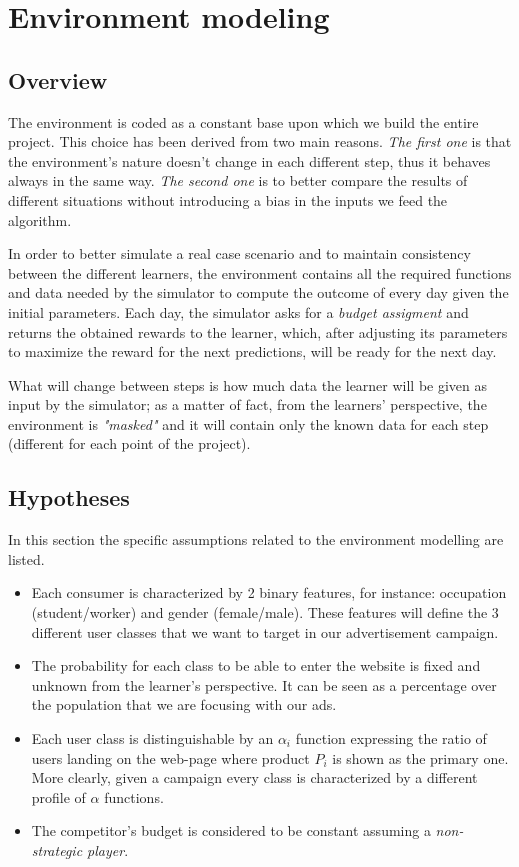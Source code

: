 \chapter{Environment modeling}

\section{Overview}
\label{chap:env_overview}

The environment is coded as a constant base upon which we build the entire project. This choice has been derived from two main reasons. \textit{The first one} is that the environment's nature doesn't change in each different step, thus it behaves always in the same way. \textit{The second one} is to better compare the results of different situations without introducing a bias in the inputs we feed the algorithm.

In order to better simulate a real case scenario and to maintain consistency between the different learners, the environment contains all the required functions and data needed by the simulator to compute the outcome of every day given the initial parameters. Each day, the simulator asks for a \textit{budget assigment} and returns the obtained rewards to the learner, which, after adjusting its parameters to maximize the reward for the next predictions, will be ready for the next day.

What will change between steps is how much data the learner will be given as input by the simulator; as a matter of fact, from the learners' perspective, the environment is \textit{"masked"} and it will contain only the known data for each step (different for each point of the project).

\section{Hypotheses}
\label{sec:env_hypoteses}

In this section the specific assumptions related to the environment modelling are listed.

\begin{itemize}
    \item Each consumer is characterized by 2 binary features, for instance: occupation (student/worker) and gender (female/male). These features will define the 3 different user classes that we want to target in our advertisement campaign.
    \item The probability for each class to be able to enter the website is fixed and unknown from the learner's perspective. It can be seen as a percentage over the population that we are focusing with our ads.
    \item Each user class is distinguishable by an $\alpha_i$ function expressing the ratio of users landing on the web-page where product $P_i$ is shown as the primary one. More clearly, given a campaign every class is characterized by a different profile of $\alpha$ functions.
    \item The competitor's budget is considered to be constant assuming a \textit{non-strategic player}.
\end{itemize}

